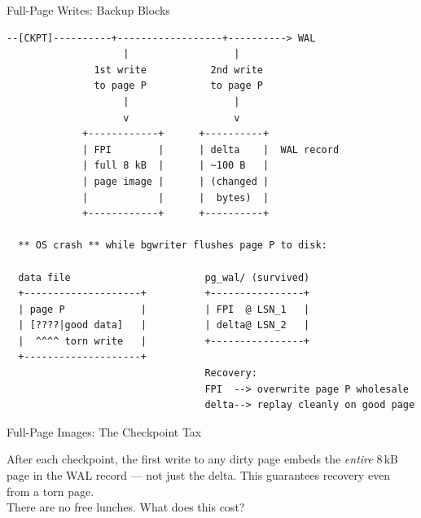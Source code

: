 \documentclass[aspectratio=169,10pt]{beamer}
\begin{document}
\begin{frame}[fragile]{Full-Page Writes: Backup Blocks}
\begin{lstlisting}[style=ascii]
  --[CKPT]----------+------------------+----------> WAL
                    |                  |
               1st write           2nd write
               to page P           to page P
                    |                  |
                    v                  v
             +------------+      +----------+
             | FPI        |      | delta    |  WAL record
             | full 8 kB  |      | ~100 B   |
             | page image |      | (changed |
             |            |      |  bytes)  |
             +------------+      +----------+

  ** OS crash ** while bgwriter flushes page P to disk:

  data file                       pg_wal/ (survived)
  +--------------------+          +----------------+
  | page P             |          | FPI  @ LSN_1   |
  | [????|good data]   |          | delta@ LSN_2   |
  |  ^^^^ torn write   |          +----------------+
  +--------------------+
                                  Recovery:
                                  FPI  --> overwrite page P wholesale
                                  delta--> replay cleanly on good page
\end{lstlisting}
\end{frame}

\begin{frame}{Full-Page Images: The Checkpoint Tax}

  \begin{block}{}
    After each checkpoint, the first write to any dirty page embeds
    the \textit{entire} 8\,kB page in the WAL record --- not just the delta.
    This guarantees recovery even from a torn page.\\[0.4em]
    There are no free lunches.  What does this cost?
  \end{block}

\end{frame}
\end{document}

